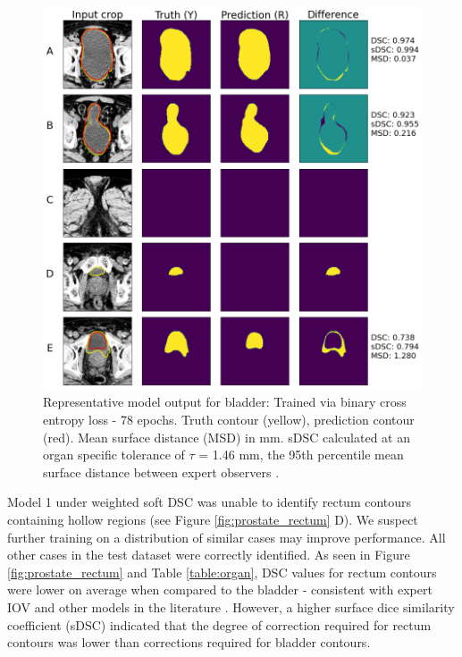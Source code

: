 \begin{figure}[H]
	\begin{center}
		\includegraphics[width=1.0\textwidth]{figures/prostate_BCE_bladder}
		\caption{Representative model output for bladder: Trained via binary cross entropy loss - 78 epochs. Truth contour (yellow), prediction contour (red). Mean surface distance (MSD) in mm. sDSC \cite{Nikolov_2018} calculated at an organ specific tolerance of $\tau$ = 1.46 mm, the 95th percentile mean surface distance between expert observers \cite{Roach_2019}.}
		\label{fig:prostate_BCE_bladder}
	\end{center}
\end{figure}

Model 1 under weighted soft DSC was unable to identify rectum contours containing hollow regions (see Figure \ref{fig:prostate_rectum} D). We suspect further training on a distribution of similar cases may improve performance. All other cases in the test dataset were correctly identified. As seen in Figure \ref{fig:prostate_rectum} and Table \ref{table:organ}, DSC values for rectum contours were lower on average when compared to the bladder - consistent with expert IOV \cite{CITATION} and other models in the literature \cite{CITATION}. However, a higher surface dice similarity coefficient (sDSC) indicated that the degree of correction required for rectum contours was lower than corrections required for bladder contours.


